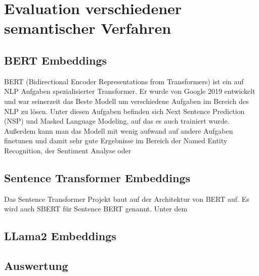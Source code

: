 \chapter{Evaluation verschiedener semantischer Verfahren}\label{ch:experiments}


\section{BERT Embeddings}

BERT (Bidirectional Encoder Representations from Transformers) \cite{devlin2019} ist ein auf NLP Aufgaben spezialisierter Transformer.
Er wurde von Google 2019 entwickelt und war seinerzeit das Beste Modell um verschiedene Aufgaben im Bereich des NLP zu lösen.
Unter diesen Aufgaben befinden sich Next Sentence Prediction (NSP) und Masked Language Modeling, auf das es auch trainiert wurde.
Außerdem kann man das Modell mit wenig aufwand auf andere Aufgaben finetunen und damit sehr gute Ergebnisse im Bereich der Named Entity Recognition, der Sentiment Analyse oder  

\section{Sentence Transformer Embeddings}

Das Sentence Transformer Projekt baut auf der Architektur von BERT auf. 
Es wird auch SBERT für Sentence BERT genannt. 
Unter dem 

\section{LLama2 Embeddings}

\section{Auswertung}